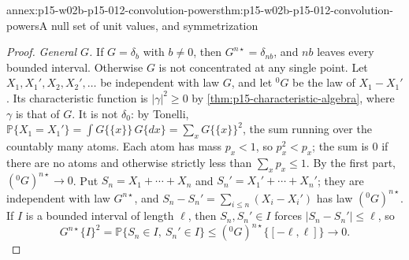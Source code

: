 \begin{annexitem}{annex:p15-w02b-p15-012-convolution-powers}{thm:p15-w02b-p15-012-convolution-powers}{A null set of unit values, and symmetrization}
\begin{proof}
\emph{General \(G\).} If \(G=\delta_b\) with \(b\neq0\), then
\(G^{n\star}=\delta_{nb}\), and \(nb\) leaves every bounded interval. Otherwise
\(G\) is not concentrated at any single point. Let
\(X_1,X_1',X_2,X_2',\ldots\) be independent with law \(G\), and let
\({}^0G\) be the law of \(X_1-X_1'\). Its characteristic function is
\(|\gamma|^2\geq0\) by \cref{thm:p15-characteristic-algebra}, where
\(\gamma\) is that of \(G\). It is not \(\delta_0\): by Tonelli,
\(\mathbb P\{X_1=X_1'\}=\int G\{\{x\}\}\,G\{dx\}=\sum_xG\{\{x\}\}^2\), the sum
running over the countably many atoms. Each atom has mass \(p_x<1\), so
\(p_x^2<p_x\); the sum is \(0\) if there are no atoms and otherwise strictly
less than \(\sum_xp_x\leq1\). By the first part, \(({}^0G)^{n\star}\to0\). Put
\(S_n=X_1+\cdots+X_n\) and \(S_n'=X_1'+\cdots+X_n'\); they are independent
with law \(G^{n\star}\), and \(S_n-S_n'=\sum_{i\leq n}(X_i-X_i')\) has law
\(({}^0G)^{n\star}\). If \(I\) is a bounded interval of length \(\ell\), then
\(S_n,S_n'\in I\) forces \(|S_n-S_n'|\leq\ell\), so
\[
 G^{n\star}\{I\}^2=\mathbb P\{S_n\in I,\ S_n'\in I\}
   \leq({}^0G)^{n\star}\{[-\ell,\ell]\}\longrightarrow0 .
\]
\end{proof}
\end{annexitem}

